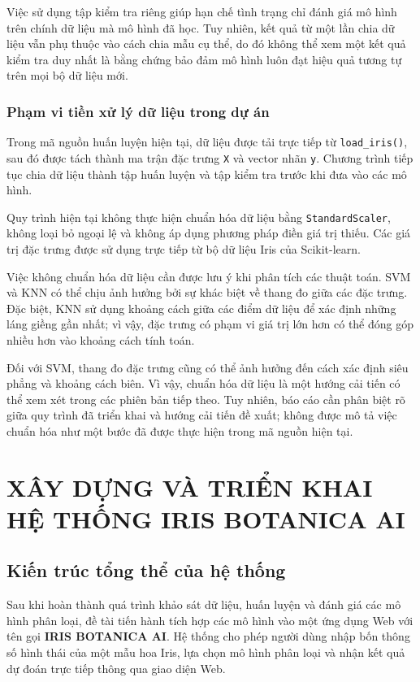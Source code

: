 \documentclass[14pt]{extarticle}
\begin{document}
	Việc sử dụng tập kiểm tra riêng giúp hạn chế tình trạng chỉ đánh giá mô hình trên chính dữ liệu mà mô hình đã học. Tuy nhiên, kết quả từ một lần chia dữ liệu vẫn phụ thuộc vào cách chia mẫu cụ thể, do đó không thể xem một kết quả kiểm tra duy nhất là bằng chứng bảo đảm mô hình luôn đạt hiệu quả tương tự trên mọi bộ dữ liệu mới.
	
	\subsubsection{Phạm vi tiền xử lý dữ liệu trong dự án}
	
	Trong mã nguồn huấn luyện hiện tại, dữ liệu được tải trực tiếp từ \texttt{load\_iris()}, sau đó được tách thành ma trận đặc trưng \texttt{X} và vector nhãn \texttt{y}. Chương trình tiếp tục chia dữ liệu thành tập huấn luyện và tập kiểm tra trước khi đưa vào các mô hình.
	
	Quy trình hiện tại không thực hiện chuẩn hóa dữ liệu bằng \texttt{StandardScaler}, không loại bỏ ngoại lệ và không áp dụng phương pháp điền giá trị thiếu. Các giá trị đặc trưng được sử dụng trực tiếp từ bộ dữ liệu Iris của Scikit-learn.
	
	Việc không chuẩn hóa dữ liệu cần được lưu ý khi phân tích các thuật toán. SVM và KNN có thể chịu ảnh hưởng bởi sự khác biệt về thang đo giữa các đặc trưng. Đặc biệt, KNN sử dụng khoảng cách giữa các điểm dữ liệu để xác định những láng giềng gần nhất; vì vậy, đặc trưng có phạm vi giá trị lớn hơn có thể đóng góp nhiều hơn vào khoảng cách tính toán.
	
	Đối với SVM, thang đo đặc trưng cũng có thể ảnh hưởng đến cách xác định siêu phẳng và khoảng cách biên. Vì vậy, chuẩn hóa dữ liệu là một hướng cải tiến có thể xem xét trong các phiên bản tiếp theo. Tuy nhiên, báo cáo cần phân biệt rõ giữa quy trình đã triển khai và hướng cải tiến đề xuất; không được mô tả việc chuẩn hóa như một bước đã được thực hiện trong mã nguồn hiện tại.
	
	
	\section{XÂY DỰNG VÀ TRIỂN KHAI HỆ THỐNG IRIS BOTANICA AI}
	
	\subsection{Kiến trúc tổng thể của hệ thống}
	
	\noindent Sau khi hoàn thành quá trình khảo sát dữ liệu, huấn luyện và đánh giá các mô hình phân loại, đề tài tiến hành tích hợp các mô hình vào một ứng dụng Web với tên gọi \textbf{IRIS BOTANICA AI}. Hệ thống cho phép người dùng nhập bốn thông số hình thái của một mẫu hoa Iris, lựa chọn mô hình phân loại và nhận kết quả dự đoán trực tiếp thông qua giao diện Web.
	
\end{document}

